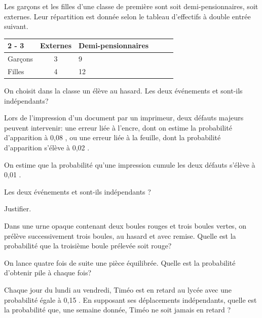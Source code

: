 \documentclass[11pt,a4paper]{book}
\begin{document}

Les garçons et les filles d'une classe de première sont soit demi-pensionnaires, soit externes. Leur répartition est donnée selon le tableau d'effectifs à double entrée suivant.

\begin{tabular}{|Xc|Xc|Xc|}
	\cline { 2 - 3 } \multicolumn{1}{c|}{} & Externes & Demi-pensionnaires \\
	\hline Garçons & 3 & 9 \\
	\hline Filles & 4 & 12 \\
	\hline
\end{tabular}

On choisit dans la classe un élève au hasard.
Les deux événements  et  sont-ils indépendants?




Lors de l'impression d'un document par un imprimeur, deux défauts majeurs peuvent intervenir: une erreur liée à l'encre, dont on estime la probabilité d'apparition à 0,08 , ou une erreur liée à la feuille, dont la probabilité d'apparition s'élève à 0,02 .

On estime que la probabilité qu'une impression cumule les deux défauts s'élève à 0,01 .

Les deux événements  et  sont-ils indépendants ?

Justifier.


Dans une urne opaque contenant deux boules rouges et trois boules vertes, on prélève successivement trois boules, au hasard et avec remise. Quelle est la probabilité que la troisième boule prélevée soit rouge?


On lance quatre fois de suite une pièce équilibrée. Quelle est la probabilité d'obtenir pile à chaque fois?


Chaque jour du lundi au vendredi, Timéo est en retard au lycée avec une probabilité égale à 0,15 . En supposant ses déplacements indépendants, quelle est la probabilité que, une semaine donnée, Timéo ne soit jamais en retard ?


\end{document}
